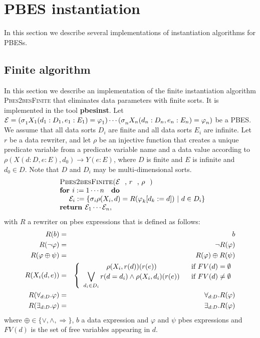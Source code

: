 

\section{PBES instantiation}

In this section we describe several implementations of instantiation
algorithms for PBESs.

\subsection{Finite algorithm}

In this section we describe an implementation of the finite instantiation
algorithm \textsc{Pbes2besFinite} that eliminates data parameters with
finite sorts. It is implemented in the tool \textbf{pbesinst}. Let $\mathcal{%
E=(\sigma }_{1}X_{1}(d_{1}:D_{1},e_{1}:E_{1})=\varphi _{1})\cdots \mathcal{%
(\sigma }_{n}X_{n}(d_{n}:D_{n},e_{n}:E_{n})=\varphi _{n})$ be a PBES. We
assume that all data sorts $D_{i}$ are finite and all data sorts $E_{i}$ are
infinite. Let $r$ be a data rewriter, and let $\rho $ be an injective
function that creates a unique predicate variable from a predicate variable
name and a data value according to $\rho (X(d:D,e:E),d_{0})\rightarrow
Y(e:E) $, where $D$ is finite and $E$ is infinite and $d_{0}\in D$. Note
that $D$ and $D_{i}$ may be multi-dimensional sorts.%
\begin{equation*}
\begin{array}{l}
\text{\textsc{Pbes2besFinite(}}\mathcal{E}\text{, }r\text{, }\rho \text{%
\textsc{)}} \\
\text{\textbf{for }}i:=1\cdots n\text{ \textbf{do}} \\
\qquad \mathcal{E}_{i}:=\{\mathcal{\sigma }_{i}\rho (X_{i},d)=R(\varphi
_{k}[d_{k}:=d])\ |\ d\in D_{i}\} \\
\text{\textbf{return }}\mathcal{E}_{1}\cdots \mathcal{E}_{n},%
\end{array}%
\end{equation*}%
with $R$ a rewriter on pbes expressions that is defined as follows:%
\begin{eqnarray*}
R(b) &=&b \\
R(\lnot \varphi ) &=&\lnot R(\varphi ) \\
R(\varphi \oplus \psi ) &=&R(\varphi )\oplus R(\psi ) \\
R(X_{i}(d,e)) &=&\left\{
\begin{array}{cc}
\rho (X_{i},r(d))(r(e)) & \text{if }FV(d)=\emptyset \\
\dbigvee\limits_{d_{i}\in D_{i}}r(d=d_{i})\wedge \rho (X_{i},d_{i})(r(e)) &
\text{if }FV(d)\neq \emptyset%
\end{array}%
\right. \\
R(\forall _{d:D}.\varphi ) &=&\forall _{d:D}.R(\varphi ) \\
R(\exists _{d:D}.\varphi ) &=&\exists _{d:D}.R(\varphi )
\end{eqnarray*}%
where $\oplus \in \{\vee ,\wedge ,\Rightarrow \}$, $b$ a data expression and
$\varphi $ and $\psi $ pbes expressions and $FV(d)$ is the set of free
variables appearing in $d$.\newpage

